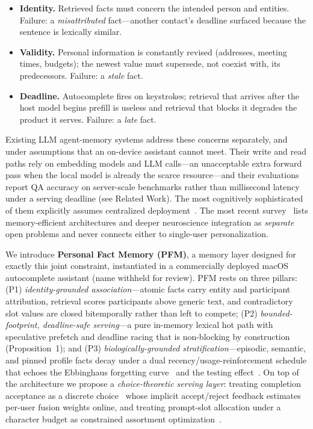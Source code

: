 \documentclass[letterpaper]{article}
\begin{document}
\begin{itemize}
\item \textbf{Identity.} Retrieved facts must concern the intended person
  and entities. Failure: a \emph{misattributed} fact---another contact's
  deadline surfaced because the sentence is lexically similar.
\item \textbf{Validity.} Personal information is constantly revised
  (addresses, meeting times, budgets); the newest value must supersede,
  not coexist with, its predecessors. Failure: a \emph{stale} fact.
\item \textbf{Deadline.} Autocomplete fires on keystrokes; retrieval that
  arrives after the host model begins prefill is useless and retrieval
  that blocks it degrades the product it serves. Failure: a \emph{late}
  fact.
\end{itemize}

Existing LLM agent-memory systems address these concerns separately, and
under assumptions that an on-device assistant cannot meet. Their write and
read paths rely on embedding models and LLM calls---an unacceptable extra
forward pass when the local model is already the scarce resource---and
their evaluations report QA accuracy on server-scale benchmarks rather
than millisecond latency under a serving deadline (see Related Work).
The most cognitively sophisticated of them explicitly assumes centralized
deployment~\citep{kerestecioglu2026human}. The most recent
survey~\citep{du2026survey} lists memory-efficient architectures and
deeper neuroscience integration as \emph{separate} open problems and
never connects either to single-user personalization.

We introduce \textbf{Personal Fact Memory (PFM)}, a memory layer designed
for exactly this joint constraint, instantiated in a commercially deployed
macOS autocomplete assistant (name withheld for review). PFM rests on
three pillars: (P1) \emph{identity-grounded association}---atomic facts
carry entity and participant attribution, retrieval scores participants
above generic text, and contradictory slot values are closed bitemporally
rather than left to compete; (P2) \emph{bounded-footprint, deadline-safe
serving}---a pure in-memory lexical hot path with speculative prefetch and
deadline racing that is non-blocking by construction (Proposition~1); and
(P3) \emph{biologically-grounded stratification}---episodic, semantic, and
pinned profile facts decay under a dual recency/usage-reinforcement
schedule that echoes the Ebbinghaus forgetting
curve~\citep{ebbinghaus1885memory} and the testing
effect~\citep{roediger2006test}. On top of the architecture we propose a
\emph{choice-theoretic serving layer}: treating completion acceptance as a
discrete choice~\citep{mcfadden1974conditional} whose implicit
accept/reject feedback estimates per-user fusion weights online, and
treating prompt-slot allocation under a character budget as constrained
assortment optimization~\citep{talluri2004revenue,
rusmevichientong2010dynamic}.
\end{document}
